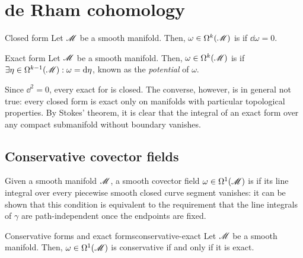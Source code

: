 
\section{de Rham cohomology}

\begin{definition}{Closed form}{}
  Let $ \mathscr{M} $ be a smooth manifold. Then, $ \omega \in \Omega^{k}(\mathscr{M}) $ is  if $ \dd \omega = 0 $.
\end{definition}

\begin{definition}{Exact form}{}
  Let $ \mathscr{M} $ be a smooth manifold. Then, $ \omega \in \Omega^{k}(\mathscr{M}) $ is  if $ \exists \eta \in \Omega^{k-1}(\mathscr{M}) : \omega = \mathrm{d} \eta $, known as the \emph{potential} of $ \omega $.
\end{definition}

Since $ \dd^2 = 0 $, every exact for is closed. The converse, however, is in general not true: every closed form is exact only on manifolds with particular topological properties. By Stokes' theorem, it is clear that the integral of an exact form over any compact submanifold without boundary vanishes.

\subsection{Conservative covector fields}

Given a smooth manifold $ \mathscr{M} $, a smooth covector field $ \omega \in \Omega^{1}(\mathscr{M}) $ is  if its line integral over every piecewise smooth closed curve segment vanishes: it can be shown that this condition is equivalent to the requirement that the line integrals of $ \gamma $ are path-independent once the endpoints are fixed.

\begin{theorem}{Conservative forms and exact forms}{conservative-exact}
  Let $ \mathscr{M} $ be a smooth manifold. Then, $ \omega \in \Omega^{1}(\mathscr{M}) $ is conservative if and only if it is exact.
\end{theorem}

